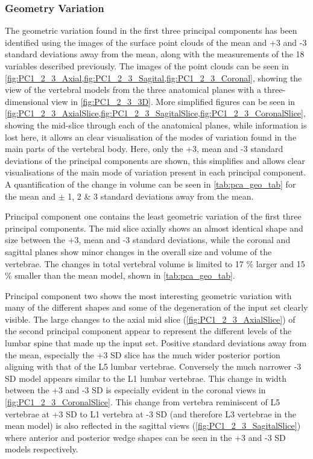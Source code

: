 \subsubsection{Geometry Variation}

The geometric variation found in the first three principal components has been identified using the images of the surface point clouds of the mean and +3 and -3 standard deviations away from the mean, along with the measurements of the 18 variables described previously.
The images of the point clouds can be seen in \cref{fig:PC1_2_3_Axial,fig:PC1_2_3_Sagital,fig:PC1_2_3_Coronal}, showing the view of the vertebral models from the three anatomical planes with a three-dimensional view in \cref{fig:PC1_2_3_3D}.
More simplified figures can be seen in \cref{fig:PC1_2_3_AxialSlice,fig:PC1_2_3_SagitalSlice,fig:PC1_2_3_CoronalSlice}, showing the mid-slice through each of the anatomical planes, while information is lost here, it allows an clear visualisation of the modes of variation found in the main parts of the vertebral body.
Here, only the +3, mean and -3 standard deviations of the principal components are shown, this simplifies and allows clear visualisations of the main mode of variation present in each principal component.
A quantification of the change in volume can be seen in \cref{tab:pca_geo_tab} for the mean and $\pm$ 1, 2 \& 3 standard deviations away from the mean.

Principal component one contains the least geometric variation of the first three principal components.
The mid slice axially shows an almost identical shape and size between the +3, mean and -3 standard deviations, while the coronal and sagittal planes show minor changes in the overall size and volume of the vertebrae.
The changes in total vertebral volume is limited to 17 \% larger and 15 \% smaller than the mean model, shown in \cref{tab:pca_geo_tab}.

Principal component two shows the most interesting geometric variation with many of the different shapes and some of the degeneration of the input set clearly visible.
The large changes to the axial mid slice (\cref{fig:PC1_2_3_AxialSlice}) of the second principal component appear to represent the different levels of the lumbar spine that made up the input set.
Positive standard deviations away from the mean, especially the +3 SD slice has the much wider posterior portion aligning with that of the L5 lumbar vertebrae.
Conversely the much narrower -3 SD model appears similar to the L1 lumbar vertebrae.
This change in width between the +3 and -3 SD is especially evident in the coronal views in \cref{fig:PC1_2_3_CoronalSlice}.
This change from vertebra reminiscent of L5 vertebrae at +3 SD to L1 vertebra at -3 SD (and therefore L3 vertebrae in the mean model) is also reflected in the sagittal views (\cref{fig:PC1_2_3_SagitalSlice}) where anterior and posterior wedge shapes can be seen in the +3 and -3 SD models respectively.

